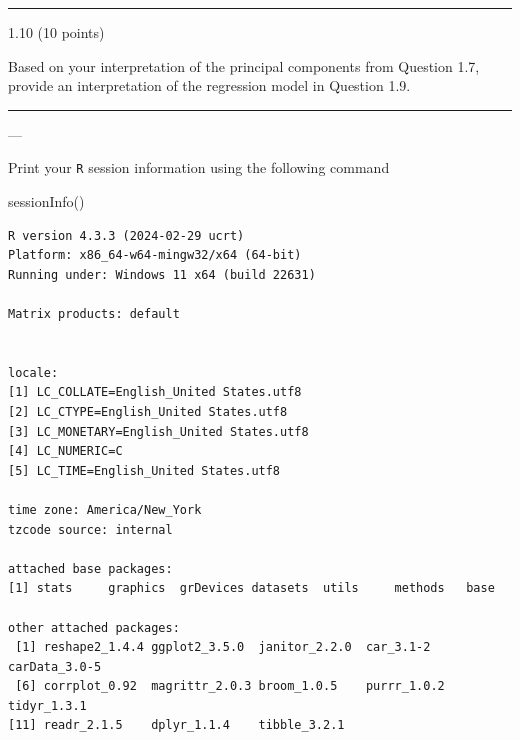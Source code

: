 \documentclass[
  letterpaper,
  DIV=11,
  numbers=noendperiod]{scrartcl}
\newenvironment{Shaded}{\begin{snugshade}}{\end{snugshade}}
\newcommand{\FunctionTok}[1]{\textcolor[rgb]{0.28,0.35,0.67}{#1}}
\newcommand{\NormalTok}[1]{\textcolor[rgb]{0.00,0.23,0.31}{#1}}
\begin{document}
\begin{center}\rule{0.5\linewidth}{0.5pt}\end{center}

1.10 (10 points)

Based on your interpretation of the principal components from Question
1.7, provide an interpretation of the regression model in Question 1.9.

\begin{center}\rule{0.5\linewidth}{0.5pt}\end{center}

\pagebreak

---

\begin{tcolorbox}[enhanced jigsaw, leftrule=.75mm, rightrule=.15mm, left=2mm, colframe=quarto-callout-note-color-frame, bottomtitle=1mm, colbacktitle=quarto-callout-note-color!10!white, titlerule=0mm, breakable, opacitybacktitle=0.6, coltitle=black, arc=.35mm, colback=white, title=\textcolor{quarto-callout-note-color}{\faInfo}\hspace{0.5em}{Session Information}, toptitle=1mm, toprule=.15mm, bottomrule=.15mm, opacityback=0]

Print your \texttt{R} session information using the following command

\begin{Shaded}
\begin{Highlighting}[]
\FunctionTok{sessionInfo}\NormalTok{()}
\end{Highlighting}
\end{Shaded}

\begin{verbatim}
R version 4.3.3 (2024-02-29 ucrt)
Platform: x86_64-w64-mingw32/x64 (64-bit)
Running under: Windows 11 x64 (build 22631)

Matrix products: default


locale:
[1] LC_COLLATE=English_United States.utf8 
[2] LC_CTYPE=English_United States.utf8   
[3] LC_MONETARY=English_United States.utf8
[4] LC_NUMERIC=C                          
[5] LC_TIME=English_United States.utf8    

time zone: America/New_York
tzcode source: internal

attached base packages:
[1] stats     graphics  grDevices datasets  utils     methods   base     

other attached packages:
 [1] reshape2_1.4.4 ggplot2_3.5.0  janitor_2.2.0  car_3.1-2      carData_3.0-5 
 [6] corrplot_0.92  magrittr_2.0.3 broom_1.0.5    purrr_1.0.2    tidyr_1.3.1   
[11] readr_2.1.5    dplyr_1.1.4    tibble_3.2.1  


\end{verbatim}
\end{tcolorbox}
\end{document}
